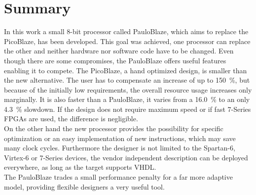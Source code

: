 \chapter{Summary}
\label{ch:sum}
In this work a small 8-bit processor called PauloBlaze, which aims to replace the PicoBlaze, has been developed.
This goal was achieved, one processor can replace the other and neither hardware nor software code have to be changed.
Even though there are some compromises, the PauloBlaze offers useful features enabling it to compete.
The PicoBlaze, a hand optimized design, is smaller than the new alternative.
The user has to compensate an increase of up to \SI{150}{\percent}, but because of the initially low requirements, the overall resource usage increases only marginally.
It is also faster than a PauloBlaze, it varies from a \SI{16.0}{\percent} to an only \SI{4.3}{\percent} slowdown.
If the design does not require maximum speed or if fast 7-Series FPGAs are used, the difference is negligible.
\\
On the other hand the new processor provides the possibility for specific optimization or an easy implementation of new instructions, which may save many clock cycles.
Furthermore the designer is not limited to the Spartan-6, Virtex-6 or 7-Series devices, the vendor independent description can be deployed everywhere, as long as the target supports VHDL.
\\
The PauloBlaze trades a small performance penalty for a far more adaptive model, providing flexible designers a very useful tool.
